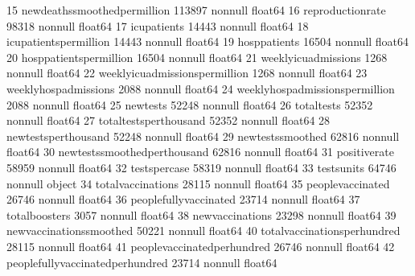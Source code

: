 \documentclass[letterpaper,10pt,english]{jupyterBook}
\begin{document}
\begin{sphinxVerbatim}[commandchars=\\\{\}]
 15  new\PYGZus{}deaths\PYGZus{}smoothed\PYGZus{}per\PYGZus{}million          113897 non\PYGZhy{}null  float64
 16  reproduction\PYGZus{}rate                        98318 non\PYGZhy{}null   float64
 17  icu\PYGZus{}patients                             14443 non\PYGZhy{}null   float64
 18  icu\PYGZus{}patients\PYGZus{}per\PYGZus{}million                 14443 non\PYGZhy{}null   float64
 19  hosp\PYGZus{}patients                            16504 non\PYGZhy{}null   float64
 20  hosp\PYGZus{}patients\PYGZus{}per\PYGZus{}million                16504 non\PYGZhy{}null   float64
 21  weekly\PYGZus{}icu\PYGZus{}admissions                    1268 non\PYGZhy{}null    float64
 22  weekly\PYGZus{}icu\PYGZus{}admissions\PYGZus{}per\PYGZus{}million        1268 non\PYGZhy{}null    float64
 23  weekly\PYGZus{}hosp\PYGZus{}admissions                   2088 non\PYGZhy{}null    float64
 24  weekly\PYGZus{}hosp\PYGZus{}admissions\PYGZus{}per\PYGZus{}million       2088 non\PYGZhy{}null    float64
 25  new\PYGZus{}tests                                52248 non\PYGZhy{}null   float64
 26  total\PYGZus{}tests                              52352 non\PYGZhy{}null   float64
 27  total\PYGZus{}tests\PYGZus{}per\PYGZus{}thousand                 52352 non\PYGZhy{}null   float64
 28  new\PYGZus{}tests\PYGZus{}per\PYGZus{}thousand                   52248 non\PYGZhy{}null   float64
 29  new\PYGZus{}tests\PYGZus{}smoothed                       62816 non\PYGZhy{}null   float64
 30  new\PYGZus{}tests\PYGZus{}smoothed\PYGZus{}per\PYGZus{}thousand          62816 non\PYGZhy{}null   float64
 31  positive\PYGZus{}rate                            58959 non\PYGZhy{}null   float64
 32  tests\PYGZus{}per\PYGZus{}case                           58319 non\PYGZhy{}null   float64
 33  tests\PYGZus{}units                              64746 non\PYGZhy{}null   object 
 34  total\PYGZus{}vaccinations                       28115 non\PYGZhy{}null   float64
 35  people\PYGZus{}vaccinated                        26746 non\PYGZhy{}null   float64
 36  people\PYGZus{}fully\PYGZus{}vaccinated                  23714 non\PYGZhy{}null   float64
 37  total\PYGZus{}boosters                           3057 non\PYGZhy{}null    float64
 38  new\PYGZus{}vaccinations                         23298 non\PYGZhy{}null   float64
 39  new\PYGZus{}vaccinations\PYGZus{}smoothed                50221 non\PYGZhy{}null   float64
 40  total\PYGZus{}vaccinations\PYGZus{}per\PYGZus{}hundred           28115 non\PYGZhy{}null   float64
 41  people\PYGZus{}vaccinated\PYGZus{}per\PYGZus{}hundred            26746 non\PYGZhy{}null   float64
 42  people\PYGZus{}fully\PYGZus{}vaccinated\PYGZus{}per\PYGZus{}hundred      23714 non\PYGZhy{}null   float64

\end{sphinxVerbatim}
\end{document}
